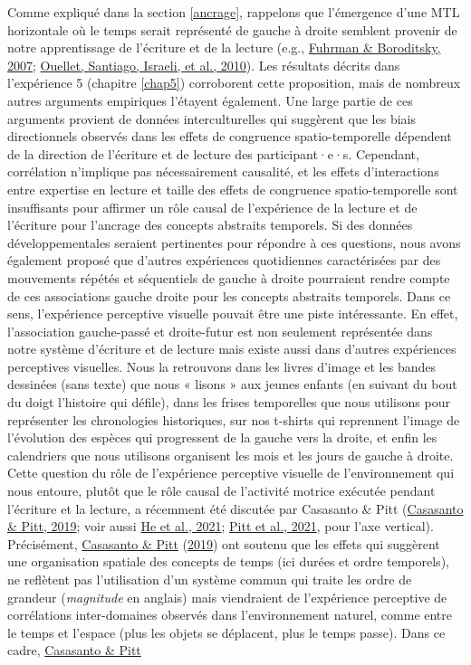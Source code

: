 \documentclass[
  a4paper,12pt,twoside,onecolumn,openright,final,oldfontcommands]{memoir}
\begin{document}
Comme expliqué dans la section \ref{ancrage}, rappelons que l'émergence d'une MTL horizontale où le temps serait représenté de gauche à droite semblent provenir de notre apprentissage de l'écriture et de la lecture (e.g., \protect\hyperlink{ref-fuhrman_mental_2007}{Fuhrman \& Boroditsky, 2007}; \protect\hyperlink{ref-ouellet_is_2010}{Ouellet, Santiago, Israeli, et al., 2010}). Les résultats décrits dans l'expérience 5 (chapitre \ref{chap5}) corroborent cette proposition, mais de nombreux autres arguments empiriques l'étayent également. Une large partie de ces arguments provient de données interculturelles qui suggèrent que les biais directionnels observés dans les effets de congruence spatio-temporelle dépendent de la direction de l'écriture et de lecture des participant·e·s. Cependant, corrélation n'implique pas nécessairement causalité, et les effets d'interactions entre expertise en lecture et taille des effets de congruence spatio-temporelle sont insuffisants pour affirmer un rôle causal de l'expérience de la lecture et de l'écriture pour l'ancrage des concepts abstraits temporels. Si des données développementales seraient pertinentes pour répondre à ces questions, nous avons également proposé que d'autres expériences quotidiennes caractérisées par des mouvements répétés et séquentiels de gauche à droite pourraient rendre compte de ces associations gauche droite pour les concepts abstraits temporels. Dans ce sens, l'expérience perceptive visuelle pouvait être une piste intéressante. En effet, l'association gauche-passé et droite-futur est non seulement représentée dans notre système d'écriture et de lecture mais existe aussi dans d'autres expériences perceptives visuelles. Nous la retrouvons dans les livres d'image et les bandes dessinées (sans texte) que nous « lisons » aux jeunes enfants (en suivant du bout du doigt l'histoire qui défile), dans les frises temporelles que nous utilisons pour représenter les chronologies historiques, sur nos t-shirts qui reprennent l'image de l'évolution des espèces qui progressent de la gauche vers la droite, et enfin les calendriers que nous utilisons organisent les mois et les jours de gauche à droite. Cette question du rôle de l'expérience perceptive visuelle de l'environnement qui nous entoure, plutôt que le rôle causal de l'activité motrice exécutée pendant l'écriture et la lecture, a récemment été discutée par Casasanto \& Pitt (\protect\hyperlink{ref-casasanto_faulty_2019}{Casasanto \& Pitt, 2019}; voir aussi \protect\hyperlink{ref-he_variability_2021}{He et al., 2021}; \protect\hyperlink{ref-pitt_spatial_2021-1}{Pitt et al., 2021}, pour l'axe vertical). Précisément, \protect\hyperlink{ref-casasanto_faulty_2019}{Casasanto \& Pitt} (\protect\hyperlink{ref-casasanto_faulty_2019}{2019}) ont soutenu que les effets qui suggèrent une organisation spatiale des concepts de temps (ici durées et ordre temporels), ne reflètent pas l'utilisation d'un système commun qui traite les ordre de grandeur (\emph{magnitude} en anglais) mais viendraient de l'expérience perceptive de corrélations inter-domaines observés dans l'environnement naturel, comme entre le temps et l'espace (plus les objets se déplacent, plus le temps passe). Dans ce cadre, \protect\hyperlink{ref-casasanto_faulty_2019}{Casasanto \& Pitt} 
\end{document}
